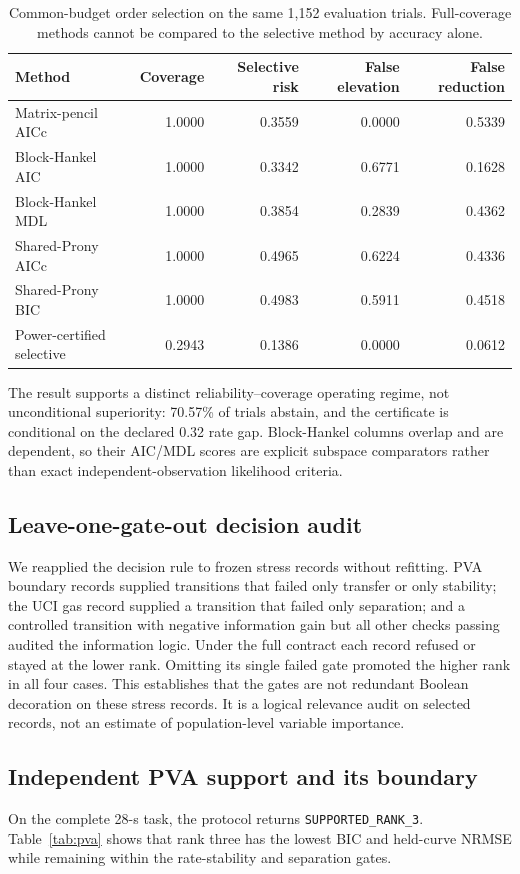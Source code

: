 \documentclass[11pt]{article}
\begin{document}
\begin{table}[H]
\centering
\caption{Common-budget order selection on the same 1,152 evaluation trials. Full-coverage methods cannot be compared to the selective method by accuracy alone.}
\label{tab:common-budget}
\begin{tabular}{lrrrr}
\toprule
Method & Coverage & Selective risk & False elevation & False reduction \\
\midrule
Matrix-pencil AICc & 1.0000 & 0.3559 & 0.0000 & 0.5339 \\
Block-Hankel AIC & 1.0000 & 0.3342 & 0.6771 & 0.1628 \\
Block-Hankel MDL & 1.0000 & 0.3854 & 0.2839 & 0.4362 \\
Shared-Prony AICc & 1.0000 & 0.4965 & 0.6224 & 0.4336 \\
Shared-Prony BIC & 1.0000 & 0.4983 & 0.5911 & 0.4518 \\
Power-certified selective & 0.2943 & 0.1386 & 0.0000 & 0.0612 \\
\bottomrule
\end{tabular}
\end{table}

The result supports a distinct reliability--coverage operating regime, not unconditional superiority: 70.57\% of trials abstain, and the certificate is conditional on the declared 0.32 rate gap. Block-Hankel columns overlap and are dependent, so their AIC/MDL scores are explicit subspace comparators rather than exact independent-observation likelihood criteria.

\subsection{Leave-one-gate-out decision audit}
We reapplied the decision rule to frozen stress records without refitting. PVA boundary records supplied transitions that failed only transfer or only stability; the UCI gas record supplied a transition that failed only separation; and a controlled transition with negative information gain but all other checks passing audited the information logic. Under the full contract each record refused or stayed at the lower rank. Omitting its single failed gate promoted the higher rank in all four cases. This establishes that the gates are not redundant Boolean decoration on these stress records. It is a logical relevance audit on selected records, not an estimate of population-level variable importance.
\subsection{Independent PVA support and its boundary}
On the complete 28-s task, the protocol returns \texttt{SUPPORTED\_RANK\_3}. Table~\ref{tab:pva} shows that rank three has the lowest BIC and held-curve NRMSE while remaining within the rate-stability and separation gates.
\end{document}
